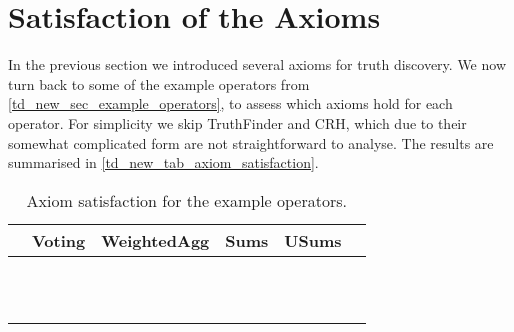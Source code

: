 \section{Satisfaction of the Axioms}
\label{td_new_sec_satisfaction_of_the_axioms}

In the previous section we introduced several axioms for truth discovery. We
now turn back to some of the example operators from
\cref{td_new_sec_example_operators}, to assess which axioms hold for each
operator. For simplicity we skip TruthFinder and CRH, which due to their
somewhat complicated form are not straightforward to analyse. The results are
summarised in \cref{td_new_tab_axiom_satisfaction}.

\begin{table}
    \centering
    \caption{Axiom satisfaction for the example operators.}
    \def\yes{\checkmark}
    \def\no{\sffamily{X}}
    \def\notsure{\sffamily{?}}
    \begin{tabular}{lccccc}
        &
        Voting             &
        WeightedAgg        &
        Sums               &
        USums              \\

        \toprule

        \claimcoherence{} &
            \yes{} &
            \yes{} &
            \yes{} &
            \yes{} &
            \\
        \sourcecoherence{} &
            \no{} &
            \no{} &
            \yes{} &
            \yes{} &
            \\
        \symmetry{} &
            \yes{} &
            \yes{} &
            \yes{} &
            \yes{} &
            \\
        \freshposresp{} &
            \yes{} &
            \yes{} &
            \no{} &
            \notsure{} &
            \\
        \sourceposresp{} &
            \no{} &
            \yes{} &
            \no{} &
            \notsure{} &
            \\
        \marginaltrustworthiness{} &
            \yes{} &
            \yes{} &
            \yes{} &
            \yes{} &
            \\
        \trustbasedmon{} &
            \yes{} &
            \yes{} &
            \yes{} &
            \yes{} &
            \\
        \classicalindependence{} &
            \yes{} &
            \no{} &
            \no{} &
            \no{} &
            \\
        \disjointindependence{} &
            \yes{} &
            \yes{} &
            \no{} &
            \no{} &
            \\
        \conflictcoherence{} &
            \no{} &
            \no{} &
            \no{} &
            \no{} &
            \\
        \anticoherence{} &
            \no{} &
            \no{} &
            \no{} &
            \no{} &
            \\


\end{tabular}
\end{table}
